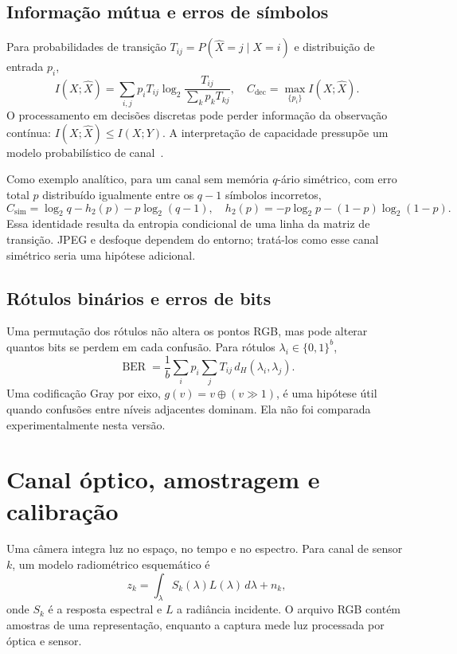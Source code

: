 \documentclass[11pt,a4paper]{article}
\newcommand{\BER}{\operatorname{BER}}
\begin{document}
\subsection{Informação mútua e erros de símbolos}
Para probabilidades de transição $T_{ij}=P(\widehat X=j\mid X=i)$ e distribuição de entrada $p_i$,
\begin{equation}
I(X;\widehat X)=\sum_{i,j}p_iT_{ij}\log_2\frac{T_{ij}}{\sum_kp_kT_{kj}},
\quad C_{\mathrm{dec}}=\max_{\{p_i\}}I(X;\widehat X).
\end{equation}
O processamento em decisões discretas pode perder informação da observação contínua: $I(X;\widehat X)\le I(X;Y)$. A interpretação de capacidade pressupõe um modelo probabilístico de canal~\cite{1948shannonCommunication}.

Como exemplo analítico, para um canal sem memória $q$-ário simétrico, com erro total $p$ distribuído igualmente entre os $q-1$ símbolos incorretos,
\begin{equation}
C_{\mathrm{sim}}=\log_2q-h_2(p)-p\log_2(q-1),
\quad h_2(p)=-p\log_2p-(1-p)\log_2(1-p).
\end{equation}
Essa identidade resulta da entropia condicional de uma linha da matriz de transição. JPEG e desfoque dependem do entorno; tratá-los como esse canal simétrico seria uma hipótese adicional.

\subsection{Rótulos binários e erros de bits}
Uma permutação dos rótulos não altera os pontos RGB, mas pode alterar quantos bits se perdem em cada confusão. Para rótulos $\lambda_i\in\{0,1\}^b$,
\begin{equation}
\BER=\frac1b\sum_i p_i\sum_jT_{ij}\,d_H(\lambda_i,\lambda_j).
\end{equation}
Uma codificação Gray por eixo, $g(v)=v\oplus(v\!\gg\!1)$, é uma hipótese útil quando confusões entre níveis adjacentes dominam. Ela não foi comparada experimentalmente nesta versão.

\section{Canal óptico, amostragem e calibração}
Uma câmera integra luz no espaço, no tempo e no espectro. Para canal de sensor $k$, um modelo radiométrico esquemático é
\begin{equation}
z_k=\int_{\lambda}S_k(\lambda)L(\lambda)\,d\lambda+n_k,
\end{equation}
onde $S_k$ é a resposta espectral e $L$ a radiância incidente. O arquivo RGB contém amostras de uma representação, enquanto a captura mede luz processada por óptica e sensor.
\end{document}
